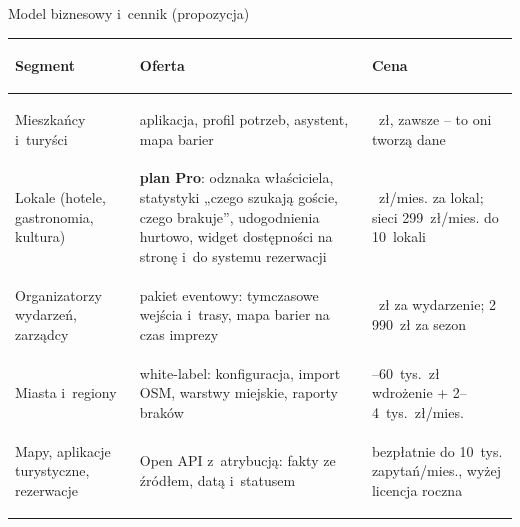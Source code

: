 \begin{frame}{Model biznesowy i~cennik (propozycja)}
  \scriptsize
  \renewcommand{\arraystretch}{1.15}
  \begin{tabularx}{\textwidth}{@{}>{\bfseries\raggedright\arraybackslash}p{3.0cm} X >{\raggedright\arraybackslash}p{4.2cm}@{}}
    \toprule
    Segment & Oferta & Cena \\
    \midrule
    Mieszkańcy i~turyści & aplikacja, profil potrzeb, asystent, mapa barier & 0~zł, zawsze -- to oni tworzą dane \\
    Lokale (hotele, gastronomia, kultura) & \textbf{plan Pro}: odznaka właściciela, statystyki „czego szukają goście, czego brakuje”,
      udogodnienia hurtowo, widget dostępności na stronę i~do systemu rezerwacji & 49~zł/mies. za lokal; sieci 299~zł/mies. do 10~lokali \\
    Organizatorzy wydarzeń, zarządcy & pakiet eventowy: tymczasowe wejścia i~trasy, mapa barier na czas imprezy & 990~zł za wydarzenie; 2\,990~zł za sezon \\
    Miasta i~regiony & white-label: konfiguracja, import OSM, warstwy miejskie, raporty braków & 30--60~tys.~zł wdrożenie + 2--4~tys.~zł/mies. \\
    Mapy, aplikacje turystyczne, rezerwacje & Open API z~atrybucją: fakty ze źródłem, datą i~statusem & bezpłatnie do 10~tys. zapytań/mies., wyżej licencja roczna \\
    \bottomrule
  \end{tabularx}


\end{frame}
